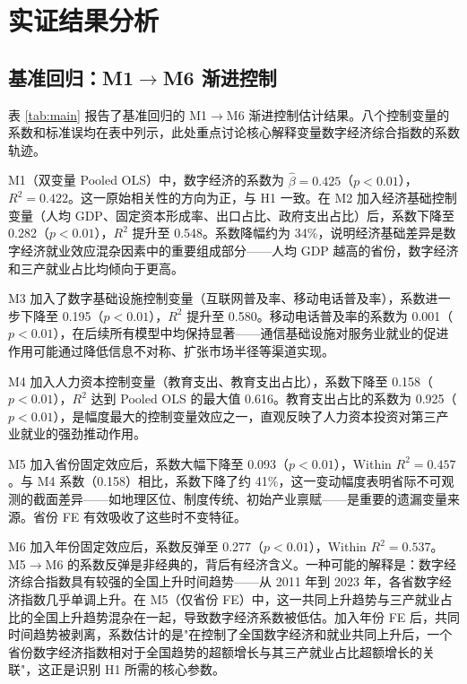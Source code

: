 \section{实证结果分析}

\subsection{基准回归：M1$\rightarrow$M6 渐进控制}

表 \ref{tab:main} 报告了基准回归的 M1$\rightarrow$M6 渐进控制估计结果。八个控制变量的系数和标准误均在表中列示，此处重点讨论核心解释变量数字经济综合指数的系数轨迹。



M1（双变量 Pooled OLS）中，数字经济的系数为 $\hat{\beta}=0.425$（$p<0.01$），$R^2=0.422$。这一原始相关性的方向为正，与 H1 一致。在 M2 加入经济基础控制变量（人均 GDP、固定资本形成率、出口占比、政府支出占比）后，系数下降至 0.282（$p<0.01$），$R^2$ 提升至 0.548。系数降幅约为 34\%，说明经济基础差异是数字经济就业效应混杂因素中的重要组成部分——人均 GDP 越高的省份，数字经济和三产就业占比均倾向于更高。

M3 加入了数字基础设施控制变量（互联网普及率、移动电话普及率），系数进一步下降至 0.195（$p<0.01$），$R^2$ 提升至 0.580。移动电话普及率的系数为 0.001（$p<0.01$），在后续所有模型中均保持显著——通信基础设施对服务业就业的促进作用可能通过降低信息不对称、扩张市场半径等渠道实现。

M4 加入人力资本控制变量（教育支出、教育支出占比），系数下降至 0.158（$p<0.01$），$R^2$ 达到 Pooled OLS 的最大值 0.616。教育支出占比的系数为 0.925（$p<0.01$），是幅度最大的控制变量效应之一，直观反映了人力资本投资对第三产业就业的强劲推动作用。

M5 加入省份固定效应后，系数大幅下降至 0.093（$p<0.01$），Within $R^2=0.457$。与 M4 系数（0.158）相比，系数下降了约 41\%，这一变动幅度表明省际不可观测的截面差异——如地理区位、制度传统、初始产业禀赋——是重要的遗漏变量来源。省份 FE 有效吸收了这些时不变特征。

M6 加入年份固定效应后，系数反弹至 0.277（$p<0.01$），Within $R^2=0.537$。M5$\rightarrow$M6 的系数反弹是非经典的，背后有经济含义。一种可能的解释是：数字经济综合指数具有较强的全国上升时间趋势——从 2011 年到 2023 年，各省数字经济指数几乎单调上升。在 M5（仅省份 FE）中，这一共同上升趋势与三产就业占比的全国上升趋势混杂在一起，导致数字经济系数被低估。加入年份 FE 后，共同时间趋势被剥离，系数估计的是"在控制了全国数字经济和就业共同上升后，一个省份数字经济指数相对于全国趋势的超额增长与其三产就业占比超额增长的关联"，这正是识别 H1 所需的核心参数。

